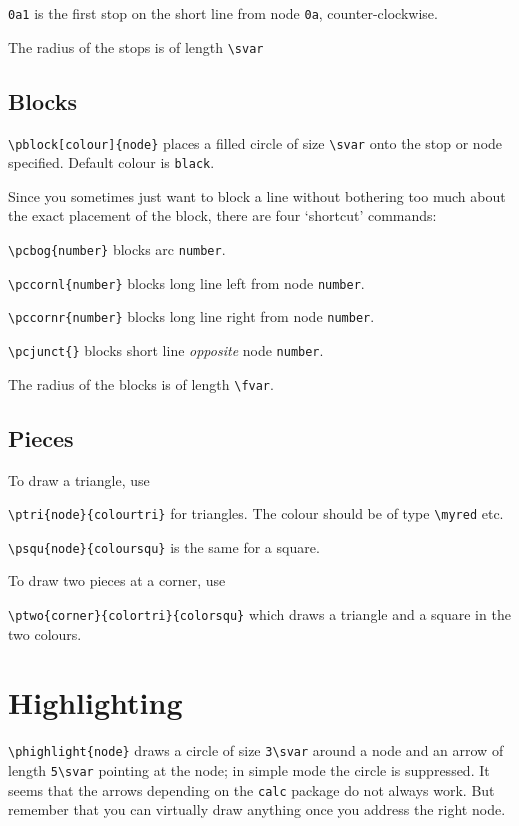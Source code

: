\documentclass[a5paper]{scrartcl}
\begin{document}
\verb|0a1| is the first stop on the short line from node \verb|0a|, counter-clockwise.

The radius of the stops is of length \verb|\svar|

\subsection*{Blocks}

\verb|\pblock[colour]{node}| places a filled circle of size \verb|\svar| onto the stop or node specified. Default colour is \verb|black|.

Since you sometimes just want to block a line without bothering too much about the exact placement of the block, there are four `shortcut' commands:

\verb|\pcbog{number}| blocks arc \verb|number|.

\verb|\pccornl{number}| blocks long line left from node  \verb|number|.

\verb|\pccornr{number}| blocks long line right from node  \verb|number|.

\verb|\pcjunct{}| blocks short line \emph{opposite} node  \verb|number|.

The radius of the blocks is of length \verb|\fvar|.

\subsection*{Pieces}

To draw a triangle, use

\verb|\ptri{node}{colourtri}| for triangles. The colour should be of type \verb|\myred| etc.

\verb|\psqu{node}{coloursqu}| is the same for a square. 

To draw two pieces at a corner, use

\verb|\ptwo{corner}{colortri}{colorsqu}| which draws a triangle and a square in the two colours.



\section*{Highlighting}

\verb|\phighlight{node}| draws a circle of size \verb|3\svar| around a node and an arrow of length \verb|5\svar| pointing at the node; in simple mode the circle is suppressed. It seems that the arrows depending on the \verb|calc| package do not always work. But remember that you can virtually draw anything once you address the right node.
\end{document}
